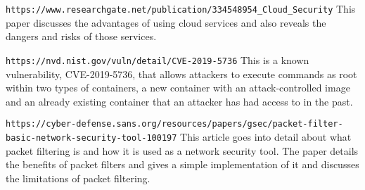 \verb|https://www.researchgate.net/publication/334548954_Cloud_Security|
This paper discusses the advantages of using cloud services and also reveals the dangers and risks of those services.

\verb|https://nvd.nist.gov/vuln/detail/CVE-2019-5736|
This is a known vulnerability, CVE-2019-5736, that allows attackers to execute commands as root within two types of containers,
a new container with an attack-controlled image and an already existing container that an attacker has had access to in the past.

\verb|https://cyber-defense.sans.org/resources/papers/gsec/packet-filter-basic-network-security-tool-100197|
This article goes into detail about what packet filtering is and how it is used as a network security tool.
The paper details the benefits of packet filters and gives a simple implementation of it and discusses
the limitations of packet filtering.
